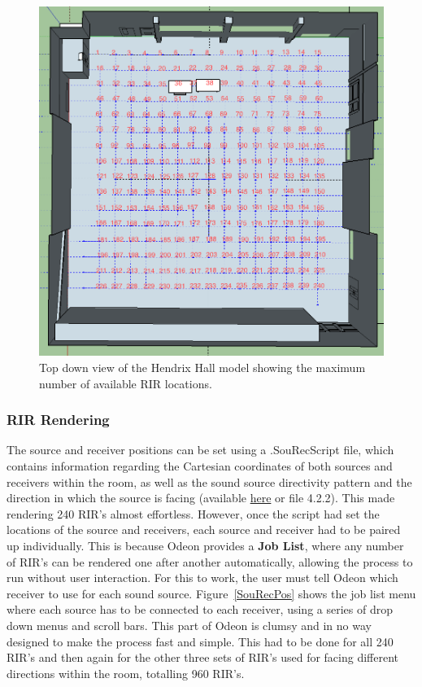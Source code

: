 \documentclass[../../main.tex]{subfiles}
\begin{document}
			\begin{figure}
				\centerline{\includegraphics[width=\textwidth]{Sections/Implementation/Odeon/images/RIRPositions/RIR_Position_Bulk.png}}
				\caption{Top down view of the Hendrix Hall model showing the maximum number of available \ac{RIR} locations.}
				\label{bulkRIRs}
			\end{figure}

		\subsubsection{RIR Rendering}
			\label{odeon:rendering}

			The source and receiver positions can be set using a .SouRecScript file, which contains information regarding the Cartesian coordinates of both sources and receivers within the room, as well as the sound source directivity pattern and the direction in which the source is facing (available \href{http://lt669.github.io/pages/Bulk_0.txt}{here} or file 4.2.2). This made rendering 240 \ac{RIR}'s almost effortless. However, once the script had set the locations of the source and receivers, each source and receiver had to be paired up individually. This is because Odeon provides a \textbf{Job List}, where any number of \ac{RIR}'s can be rendered one after another automatically, allowing the process to run without user interaction. For this to work, the user must tell Odeon which receiver to use for each sound source. Figure~\ref{SouRecPos} shows the job list menu where each source has to be connected to each receiver, using a series of drop down menus and scroll bars. This part of Odeon is clumsy and in no way designed to make the process fast and simple. This had to be done for all 240 \ac{RIR}'s and then again for the other three sets of \ac{RIR}'s used for facing different directions within the room, totalling 960 \ac{RIR}'s.
\end{document}

